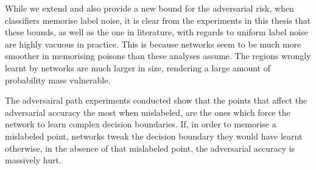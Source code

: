 \documentclass[12pt, oneside]{book}
\begin{document}
While we extend and also provide a new bound for the adversarial risk, when
classifiers memorise label noise, it is clear from the experiments in this
thesis that these bounds, as well as the one in literature, with regards to
uniform label noise are highly vacuous in practice. This is because networks
seem to be much more smoother in memorising poisons than these analyses assume.
The regions wrongly learnt by networks are much larger in size, rendering a
large amount of probability mass vulnerable.

The adversairal path experiments conducted show that the points that affect the
adversarial accuracy the most when mislabeled, are the ones which force the
network to learn complex decision boundaries. If, in order to memorise a
mislabeled point, networks tweak the decision boundary they would have learnt
otherwise, in the absence of that mislabeled point, the adversarial accuracy is
massively hurt.


\clearpage


\end{document}
